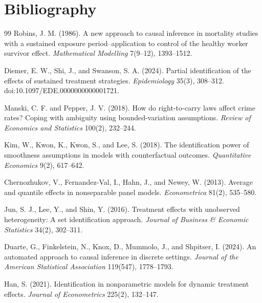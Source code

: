 \documentclass[11pt]{article}
\theoremstyle{definition}
\theoremstyle{plain}
\theoremstyle{remark}
\begin{document}
\section*{Bibliography}
\begin{thebibliography}{99}
Robins, J. M. (1986).
\newblock A new approach to causal inference in mortality studies with a sustained exposure period--application to control of the healthy worker survivor effect.
\newblock \emph{Mathematical Modelling} 7(9--12), 1393--1512.

Diemer, E. W., Shi, J., and Swanson, S. A. (2024).
\newblock Partial identification of the effects of sustained treatment strategies.
\newblock \emph{Epidemiology} 35(3), 308--312.
\newblock doi:10.1097/EDE.0000000000001721.

Manski, C. F. and Pepper, J. V. (2018).
\newblock How do right-to-carry laws affect crime rates? Coping with ambiguity using bounded-variation assumptions.
\newblock \emph{Review of Economics and Statistics} 100(2), 232--244.

Kim, W., Kwon, K., Kwon, S., and Lee, S. (2018).
\newblock The identification power of smoothness assumptions in models with counterfactual outcomes.
\newblock \emph{Quantitative Economics} 9(2), 617--642.

Chernozhukov, V., Fernandez-Val, I., Hahn, J., and Newey, W. (2013).
\newblock Average and quantile effects in nonseparable panel models.
\newblock \emph{Econometrica} 81(2), 535--580.

Jun, S. J., Lee, Y., and Shin, Y. (2016).
\newblock Treatment effects with unobserved heterogeneity: A set identification approach.
\newblock \emph{Journal of Business \& Economic Statistics} 34(2), 302--311.

Duarte, G., Finkelstein, N., Knox, D., Mummolo, J., and Shpitser, I. (2024).
\newblock An automated approach to causal inference in discrete settings.
\newblock \emph{Journal of the American Statistical Association} 119(547), 1778--1793.

Han, S. (2021).
\newblock Identification in nonparametric models for dynamic treatment effects.
\newblock \emph{Journal of Econometrics} 225(2), 132--147.


\end{thebibliography}
\end{document}

